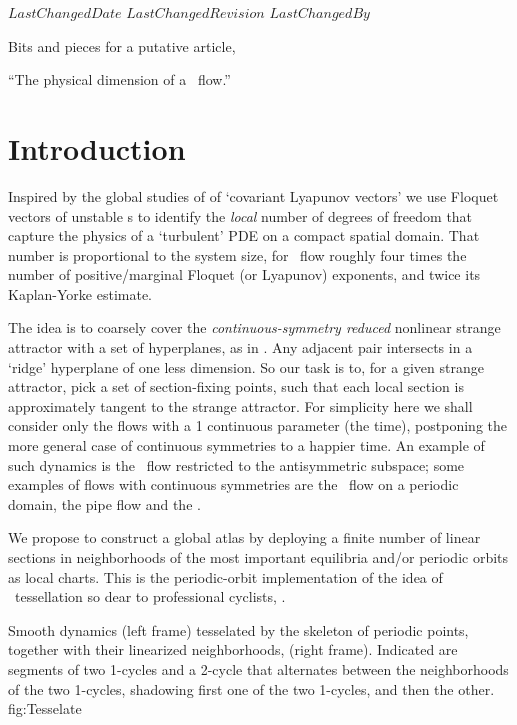 \ifsvnmulti
 {$LastChangedDate$}
 {$LastChangedRevision$} {$LastChangedBy$}
\fi

Bits and pieces for a putative article,

``The physical dimension of a \KS\ flow.''

\section{Introduction}
\label{sect:intro}

Inspired by the global
studies of  of
`covariant Lyapunov vectors' we use Floquet vectors of unstable \po s to
identify the \emph{local} number of degrees of freedom that capture the
physics of a `turbulent' PDE on a compact spatial domain. That number is
proportional to the system size, for \KS\ flow roughly four times the
number of positive/marginal Floquet (or Lyapunov) exponents, and twice its
Kaplan-Yorke estimate.

The idea is to coarsely cover the \emph{continuous-symmetry reduced}
nonlinear strange attractor with a set of
hyperplanes, as in . Any
adjacent pair intersects in a `ridge' hyperplane of one less dimension.
So our task is to, for a given strange attractor, pick a set of \Poincare
section-fixing points, such that each local section is approximately tangent to the
strange attractor. For simplicity here we shall consider only the flows
with a 1 continuous parameter (the time), postponing the more general
case of continuous symmetries to a happier time. An example of such
dynamics is the \KS\ flow restricted to the antisymmetric
subspace;
some examples of flows with continuous
symmetries are the \KS\ flow on a periodic domain, the pipe
flow and the \pCf{}.

We propose to construct a global atlas by deploying a finite
number of linear \Poincare sections in
neighborhoods of the most important equilibria and/or periodic orbits
as local charts.
This is the periodic-orbit implementation of the idea of {\statesp\
tessellation} so dear to professional cyclists, .

{}{
Smooth dynamics  (left frame) tesselated by the skeleton of periodic
points, together with their linearized neighborhoods, (right frame).
Indicated are segments of two 1-cycles and a 2-cycle that alternates
between the neighborhoods of the two 1-cycles, shadowing first one of the
two 1-cycles, and then the other.
}{fig:Tesselate} %
%
%


